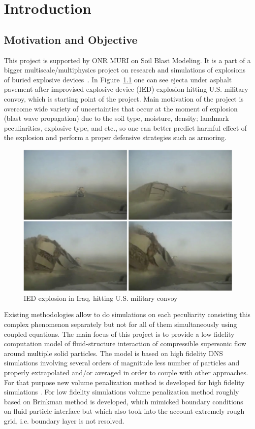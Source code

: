 \chapter{Introduction}
\label{chapter:1}

\section{Motivation and Objective}
This project is supported by ONR MURI on Soil Blast Modeling. It is a part of a bigger multiscale/multiphysics project on research and simulations of explosions of buried explosive devices~\cite{proc:muri}. In Figure~\ref{fig:muri_motiv} one can see ejecta under asphalt pavement after improvised explosive device (IED) explosion hitting U.S. military convoy, which is starting point of the project. Main motivation of the project is overcome wide variety of uncertainties that occur at the moment of explosion (blast wave propagation) due to the soil type, moisture, density; landmark peculiarities, explosive type, and etc., so one can better predict harmful effect of the explosion and perform a proper defensive strategies such as armoring.
\begin{figure}[h!]
\centering \includegraphics[scale=0.25]{fig/muri_motiv.png}
\caption{IED explosion in Iraq, hitting U.S. military convoy} \label{fig:muri_motiv}
\end{figure}

Existing methodologies allow to do simulations on each peculiarity consisting this complex phenomenon separately but not for all of them simultaneously using coupled equations. The main focus of this project is to provide a low fidelity computation model of fluid-structure interaction of compressible supersonic flow around multiple solid particles. The model is based on high fidelity DNS simulations involving several orders of magnitude less number of particles and properly extrapolated and/or averaged in order to couple with other approaches. For that purpose new volume penalization method is developed for high fidelity simulations \cite{ebd_nk_ovv_cbvp_jcp}. For low fidelity simulations volume penalization method roughly based on Brinkman method is developed, which mimicked boundary conditions on fluid-particle interface but which also took into the account extremely rough grid, i.e. boundary layer is not resolved.
